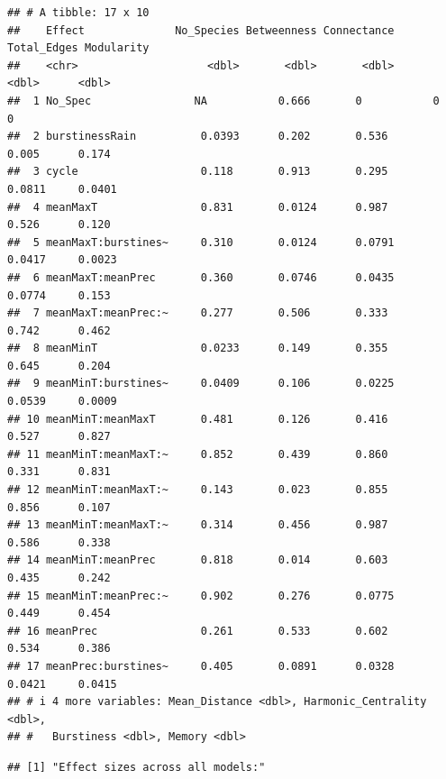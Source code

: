 \documentclass[
]{article}
\begin{document}
\begin{verbatim}
## # A tibble: 17 x 10
##    Effect              No_Species Betweenness Connectance Total_Edges Modularity
##    <chr>                    <dbl>       <dbl>       <dbl>       <dbl>      <dbl>
##  1 No_Spec                NA           0.666       0           0          0     
##  2 burstinessRain          0.0393      0.202       0.536       0.005      0.174 
##  3 cycle                   0.118       0.913       0.295       0.0811     0.0401
##  4 meanMaxT                0.831       0.0124      0.987       0.526      0.120 
##  5 meanMaxT:burstines~     0.310       0.0124      0.0791      0.0417     0.0023
##  6 meanMaxT:meanPrec       0.360       0.0746      0.0435      0.0774     0.153 
##  7 meanMaxT:meanPrec:~     0.277       0.506       0.333       0.742      0.462 
##  8 meanMinT                0.0233      0.149       0.355       0.645      0.204 
##  9 meanMinT:burstines~     0.0409      0.106       0.0225      0.0539     0.0009
## 10 meanMinT:meanMaxT       0.481       0.126       0.416       0.527      0.827 
## 11 meanMinT:meanMaxT:~     0.852       0.439       0.860       0.331      0.831 
## 12 meanMinT:meanMaxT:~     0.143       0.023       0.855       0.856      0.107 
## 13 meanMinT:meanMaxT:~     0.314       0.456       0.987       0.586      0.338 
## 14 meanMinT:meanPrec       0.818       0.014       0.603       0.435      0.242 
## 15 meanMinT:meanPrec:~     0.902       0.276       0.0775      0.449      0.454 
## 16 meanPrec                0.261       0.533       0.602       0.534      0.386 
## 17 meanPrec:burstines~     0.405       0.0891      0.0328      0.0421     0.0415
## # i 4 more variables: Mean_Distance <dbl>, Harmonic_Centrality <dbl>,
## #   Burstiness <dbl>, Memory <dbl>
\end{verbatim}

\begin{verbatim}
## [1] "Effect sizes across all models:"
\end{verbatim}
\end{document}
